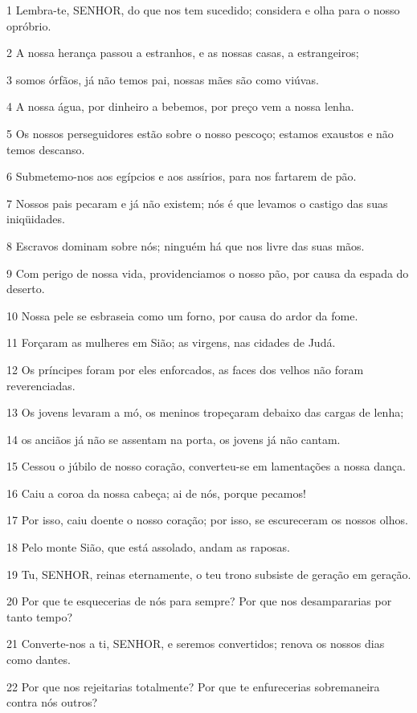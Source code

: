 \par 1 Lembra-te, SENHOR, do que nos tem sucedido; considera e olha para o nosso opróbrio.
\par 2 A nossa herança passou a estranhos, e as nossas casas, a estrangeiros;
\par 3 somos órfãos, já não temos pai, nossas mães são como viúvas.
\par 4 A nossa água, por dinheiro a bebemos, por preço vem a nossa lenha.
\par 5 Os nossos perseguidores estão sobre o nosso pescoço; estamos exaustos e não temos descanso.
\par 6 Submetemo-nos aos egípcios e aos assírios, para nos fartarem de pão.
\par 7 Nossos pais pecaram e já não existem; nós é que levamos o castigo das suas iniqüidades.
\par 8 Escravos dominam sobre nós; ninguém há que nos livre das suas mãos.
\par 9 Com perigo de nossa vida, providenciamos o nosso pão, por causa da espada do deserto.
\par 10 Nossa pele se esbraseia como um forno, por causa do ardor da fome.
\par 11 Forçaram as mulheres em Sião; as virgens, nas cidades de Judá.
\par 12 Os príncipes foram por eles enforcados, as faces dos velhos não foram reverenciadas.
\par 13 Os jovens levaram a mó, os meninos tropeçaram debaixo das cargas de lenha;
\par 14 os anciãos já não se assentam na porta, os jovens já não cantam.
\par 15 Cessou o júbilo de nosso coração, converteu-se em lamentações a nossa dança.
\par 16 Caiu a coroa da nossa cabeça; ai de nós, porque pecamos!
\par 17 Por isso, caiu doente o nosso coração; por isso, se escureceram os nossos olhos.
\par 18 Pelo monte Sião, que está assolado, andam as raposas.
\par 19 Tu, SENHOR, reinas eternamente, o teu trono subsiste de geração em geração.
\par 20 Por que te esquecerias de nós para sempre? Por que nos desampararias por tanto tempo?
\par 21 Converte-nos a ti, SENHOR, e seremos convertidos; renova os nossos dias como dantes.
\par 22 Por que nos rejeitarias totalmente? Por que te enfurecerias sobremaneira contra nós outros?



